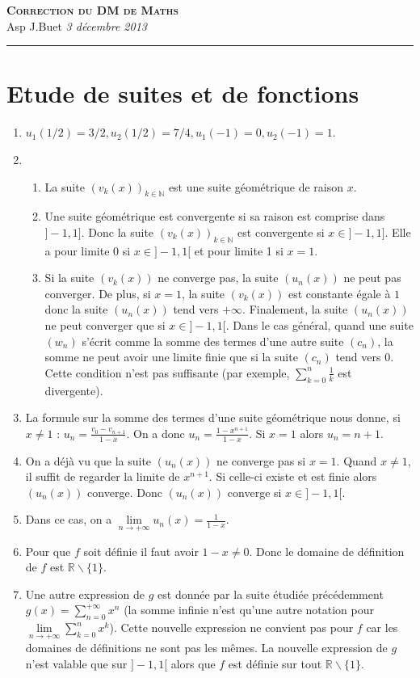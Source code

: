 \documentclass[10pt,a4paper]{article}
\newcommand{\Titre}[3]{\begin{center} {\LARGE\textbf{\textsc{#1}}}\\ #2 \hfill \emph{#3} \\  \hrule\vspace{\baselineskip}\end{center}}
\begin{document}

\Titre{Correction du DM de Maths}{Asp J.Buet}{3 décembre 2013}
\thispagestyle{plain}
\pagestyle{plain}

\section{Etude de suites et de fonctions}
\begin{enumerate}
\item $u_1(1/2)=3/2, u_2(1/2)=7/4, u_1(-1)=0, u_2(-1)=1$.
\item 
\begin{enumerate}
\item La suite $(v_k(x))_{k\in\mathbb{N}}$ est une suite géométrique de raison $x$.
\item Une suite géométrique est convergente si sa raison est comprise dans $]-1,1]$. Donc la suite $(v_k(x))_{k\in\mathbb{N}}$ est convergente si $x\in]-1,1]$.
Elle a pour limite $0$ si $x\in ]-1,1[$ et pour limite 1 si $x=1$.
\item Si la suite $(v_k(x))$ ne converge pas, la suite $(u_n(x))$ ne peut pas converger. De plus, si $x=1$, la suite $(v_k(x))$ est constante égale à $1$ donc
la suite $(u_n(x))$ tend vers $+\infty$. Finalement, la suite $(u_n(x))$ ne peut converger que si $x\in]-1,1[$. Dans le cas général, quand une suite $(w_n)$
 s'écrit comme la somme des termes d'une autre suite $(c_n)$, la somme ne peut avoir une limite finie que si la suite $(c_n)$ tend vers $0$. Cette condition 
n'est pas suffisante (par exemple, $\sum\limits_{k=0}^n\frac{1}{k}$ est divergente).
\end{enumerate}
\item La formule sur la somme des termes d'une suite géométrique nous donne, si $x\neq1$ : $u_n=\frac{v_0-v_{n+1}}{1-x}$. On a donc $u_n=\frac{1-x^{n+1}}{1-x}$.
Si $x=1$ alors $u_n=n+1$.
\item On a déjà vu que la suite $(u_n(x))$ ne converge pas si $x=1$. Quand $x\neq1$, il suffit de regarder la limite de $x^{n+1}$. Si celle-ci existe et 
est finie alors $(u_n(x))$ converge. Donc $(u_n(x))$ converge si $x\in]-1,1[$.
\item Dans ce cas, on a $\lim\limits_{n\to+\infty}u_n(x)=\frac{1}{1-x}$.
\item Pour que $f$ soit définie il faut avoir $1-x\neq 0$. Donc le domaine de définition de $f$ est $\mathbb{R}\backslash\{1\}$.
\item Une autre expression de $g$ est donnée par la suite étudiée précédemment $g(x)=\sum\limits_{n=0}^{+\infty}x^n$ (la somme infinie n'est qu'une autre 
notation pour $\lim\limits_{n\to+\infty}\sum\limits_{k=0}^nx^k$). Cette nouvelle expression ne convient pas
 pour $f$ car les domaines de définitions ne sont pas les mêmes. La nouvelle expression de $g$ n'est valable que sur $]-1,1[$ alors que $f$ est définie sur
 tout $\mathbb{R}\backslash\{1\}$.
\end{enumerate}
\end{document}
